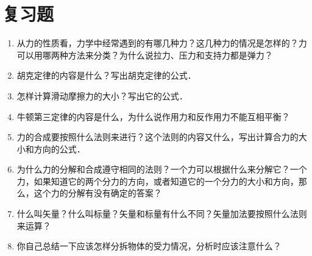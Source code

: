 \newpage

\section*{复习题}
\begin{enumerate}
    \item 从力的性质看，力学中经常遇到的有哪几种力？这几种力的情况是怎样的？力可以用哪两种方法来分类？为什么说拉力、压力和支持力都是弹力？
    \item
          胡克定律的内容是什么？写出胡克定律的公式．
    \item
          怎样计算滑动摩擦力的大小？写出它的公式．
    \item 牛顿第三定律的内容是什么，为什么说作用力和反作用力不能互相平衡？
    \item
          力的合成要按照什么法则来进行？这个法则的内容又什么，写出计算合力的大小和方向的公式．
    \item
          为什么力的分解和合成遵守相同的法则？一个力可以根据什么来分解它？一个力，如果知道它的两个分力的方向，或者知道它的一个分力的大小和方向，那么，这个力的分解有没有确定的答案？
    \item
          什么叫矢量？什么叫标量？矢量和标量有什么不同？矢量加法要按照什么法则来运算？
    \item
          你自己总结一下应该怎样分拆物体的受力情况，分析时应该注意什么？
\end{enumerate}

\newpage


